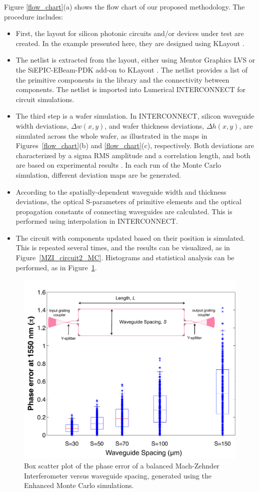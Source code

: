 \documentclass[journal]{spie}
\begin{document}
Figure \ref{flow_chart}(a) shows the flow chart of our proposed methodology. The procedure includes: 
\begin{itemize}
\item First, the layout for silicon photonic circuits and/or devices under test are created.  In the example presented here, they are designed using KLayout \cite{www_klayout}. 
\item
The netlist is extracted from the layout, either using Mentor Graphics LVS or the SiEPIC-EBeam-PDK add-on \cite{siepic-ebeam-pdk} to KLayout \cite{www_klayout}.  The netlist provides a list of the primitive components in the library and the connectivity between components.  The netlist is imported into Lumerical INTERCONNECT for circuit simulations. 
\item
The third step is a wafer simulation.  In INTERCONNECT, silicon waveguide width deviations, $\Delta w(x,y)$, and wafer thickness deviations, $\Delta h(x,y)$, are simulated across the whole wafer, as illustrated in the maps in Figures~\ref{flow_chart}(b) and \ref{flow_chart}(c), respectively. Both deviations are characterized by a sigma RMS amplitude and a correlation length, and both are based on experimental results \cite{lukas14:OFC,hochberg:wafer}. In each run of the Monte Carlo simulation, different deviation maps are be generated. 
\item
According to the spatially-dependent waveguide width and thickness deviations, the optical S-parameters of primitive elements and the optical propagation constants of connecting waveguides are calculated.  This is performed using interpolation in INTERCONNECT. 
\item
The circuit with components updated based on their position is simulated.  This is repeated several times, and the results can be visualized, as in Figure~\ref{MZI_circuit2_MC}. Histograms and statistical analysis can be performed, as in Figure~\ref{error}.
\end{itemize}

\begin{figure}[t]
    \centering
    \label{error}\includegraphics[width=0.8\linewidth]{error.pdf}
    \caption{Box scatter plot of the phase error of a balanced Mach-Zehnder Interferometer versus waveguide spacing, generated using the Enhanced Monte Carlo simulations.} 
    \label{error}
\end{figure}
\end{document}
